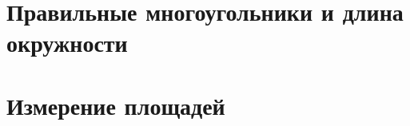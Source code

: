 \documentclass[twoside]{book}
\begin{document}
\chapter[Правильные многоугольники]{Правильные многоугольники и длина окружности}



\chapter{Измерение площадей}





{\scriptsize
\printindex
}



\tableofcontents


\end{document}
